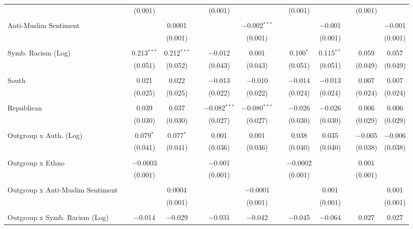 \begin{table}[H]
{\begin{tabular}{@{\extracolsep{5pt}}lcccccccccccc}
  &  & (0.001) &  &  & (0.001) &  &  & (0.001) &  &  & (0.001) &  \\ 
  & & & & & & & & & & & & \\ 
 Anti-Muslim Sentiment &  &  & 0.0001 &  &  & $-$0.002$^{***}$ &  &  & $-$0.001 &  &  & $-$0.001 \\ 
  &  &  & (0.001) &  &  & (0.001) &  &  & (0.001) &  &  & (0.001) \\ 
  & & & & & & & & & & & & \\ 
 Symb. Racism (Log) &  & 0.213$^{***}$ & 0.212$^{***}$ &  & $-$0.012 & 0.001 &  & 0.100$^{*}$ & 0.115$^{**}$ &  & 0.059 & 0.057 \\ 
  &  & (0.051) & (0.052) &  & (0.043) & (0.043) &  & (0.051) & (0.051) &  & (0.049) & (0.049) \\ 
  & & & & & & & & & & & & \\ 
 South &  & 0.021 & 0.022 &  & $-$0.013 & $-$0.010 &  & $-$0.014 & $-$0.013 &  & 0.007 & 0.007 \\ 
  &  & (0.025) & (0.025) &  & (0.022) & (0.022) &  & (0.024) & (0.024) &  & (0.024) & (0.024) \\ 
  & & & & & & & & & & & & \\ 
 Republican &  & 0.039 & 0.037 &  & $-$0.082$^{***}$ & $-$0.080$^{***}$ &  & $-$0.026 & $-$0.026 &  & 0.006 & 0.006 \\ 
  &  & (0.030) & (0.030) &  & (0.027) & (0.027) &  & (0.030) & (0.030) &  & (0.029) & (0.029) \\ 
  & & & & & & & & & & & & \\ 
 Outgroup x Auth. (Log) &  & 0.079$^{*}$ & 0.077$^{*}$ &  & 0.001 & 0.001 &  & 0.038 & 0.035 &  & $-$0.005 & $-$0.006 \\ 
  &  & (0.041) & (0.041) &  & (0.036) & (0.036) &  & (0.040) & (0.040) &  & (0.038) & (0.038) \\ 
  & & & & & & & & & & & & \\ 
 Outgroup x Ethno &  & $-$0.0003 &  &  & $-$0.001 &  &  & $-$0.0002 &  &  & 0.001 &  \\ 
  &  & (0.001) &  &  & (0.001) &  &  & (0.001) &  &  & (0.001) &  \\ 
  & & & & & & & & & & & & \\ 
 Outgroup x Anti-Muslim Sentiment &  &  & 0.0004 &  &  & $-$0.0001 &  &  & 0.001 &  &  & 0.001 \\ 
  &  &  & (0.001) &  &  & (0.001) &  &  & (0.001) &  &  & (0.001) \\ 
  & & & & & & & & & & & & \\ 
 Outgroup x Symb. Racism (Log) &  & $-$0.014 & $-$0.029 &  & $-$0.031 & $-$0.042 &  & $-$0.045 & $-$0.064 &  & 0.027 & 0.027 \\ 

\end{tabular}}
\end{table}
